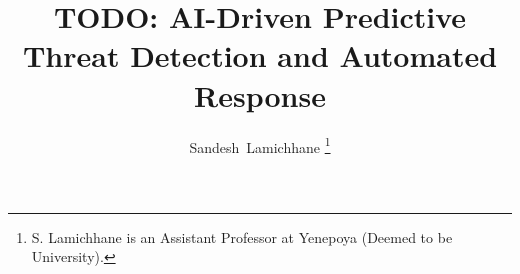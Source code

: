 \documentclass[journal]{IEEEtran}  %
\begin{document}
\title{TODO: AI-Driven Predictive Threat Detection and Automated Response}
\author{Sandesh~Lamichhane%
\thanks{S. Lamichhane is an Assistant Professor at Yenepoya (Deemed to be University).}}
\maketitle













\end{document}
